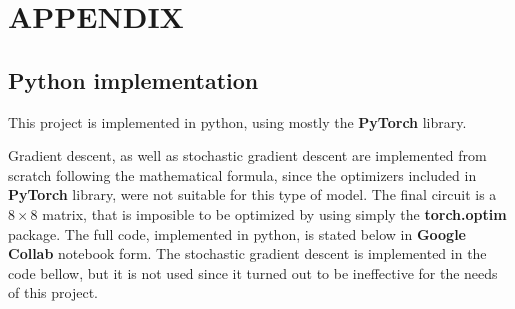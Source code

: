 \documentclass[inscr,ack,preface]{diphdthesis}
\begin{document}
\chapter{APPENDIX}
\section{Python implementation}

This project is implemented in python, using mostly the \textbf{PyTorch} library. 

Gradient descent, as well as stochastic gradient descent are implemented from scratch following the mathematical formula, since the optimizers included in \textbf{PyTorch} library, were not suitable for this type of model. The final circuit is a $8\times8$ matrix, that is imposible to be optimized by using simply the \textbf{torch.optim} package. The full code, implemented in python, is stated below in \textbf{Google Collab} notebook form. The stochastic gradient descent is implemented in the code bellow, but it is not used since it turned out to be ineffective for the needs of this project. \\ 



\printglossary




\end{document}
